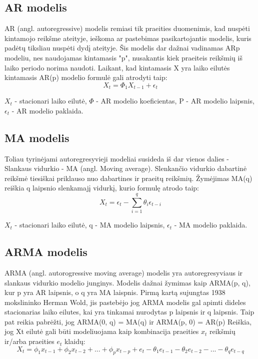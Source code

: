 \documentclass{VUMIFInfKursinis}
\begin{document}
\subsection{AR modelis}
AR (angl. autoregressive) modelis remiasi tik praeities duomenimis, kad nuspėti kintamojo reikšme ateityje, ieškoma ar pastebimas pasikartojantis
modelis, kuris padėtų tiksliau nuspėti dydį ateityje. Šis modelis dar dažnai vadinamas ARp modeliu, nes naudojamas kintamasis "p", nusakantis kiek praeiteis reikšmių 
iš laiko periodo norima naudoti. Laikant, kad kintamasis X yra laiko eilutės kintamasis AR(p) modelio formulė gali atrodyti taip: 
\[X_{t} = \Phi _{1}X_{t-1}+\epsilon_{t} \]

${X_t}$ - stacionari laiko eilutė, $\Phi$ - AR modelio koeficientas, P - AR modelio laipsnis, $ \epsilon_{t} $ - AR modelio paklaida.

\subsection {MA modelis}
Toliau tyrinėjami autoregresyvieji modeliai susideda iš dar vienos dalies - Slankaus vidurkio - MA (angl. Moving average). Slenkančio vidurkio dabartinė
reikšmė tiesiškai priklauso nuo dabartines ir praeitų reikšmių. Žymėjimas MA(q) reiškia q laipsnio slenkamajį vidurkį, kurio formulę atrodo taip:  
\[X_{t} = \epsilon_{t} - \sum_{i=1}^{q}\theta_{i}  \epsilon_{t-i}\]

${X_t}$ - stacionari laiko eilutė, q - MA modelio laipsnis, ${\epsilon_t}$ - MA modelio paklaida.

\subsection {ARMA modelis}
ARMA (angl. autorogressive moving average) modelis yra autoregresyviaus ir slankaus vidurkio modelio junginys. Modelis dažnai žymimas
kaip ARMA(p, q), kur p yra AR laipsnis, o q yra MA laispnis. Pirmą kartą sujungtas 1938 mokslininko Herman Wold, jis pastebėjo jog ARMA modelis gal apimti 
dideles stacionarias laiko eilutes, kai yra tinkamai nurodytas p laipsnis ir q laipsnis. Taip pat reikia pabrėžti, jog ARMA(0, q) = MA(q) ir ARMA(p, 0) = AR(p)
Reiškia, jog Xt eilutė gali būti modeliuojama kaip kombinacija praeities $x_{t}$ reikšmių ir/arba praeities $e_{t}$ klaidų:
\[X_{t} = \phi_{1}x_{t-1} + \phi_{2}x_{t-2} + ... + \phi_{p}x_{t-p} + e_{t} - \theta_{1}e_{t-1} - \theta_{2}e_{t-2} - ... - \theta_{q}e_{t-q}\]
\end{document}
